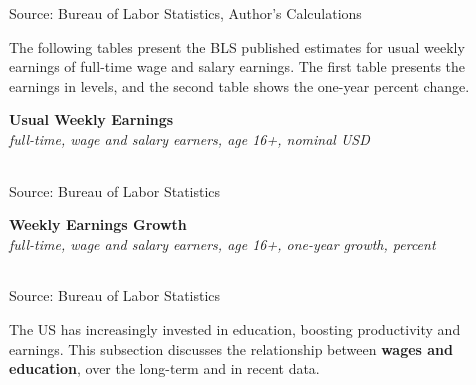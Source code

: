 \documentclass{report}
\newcommand{\tbllink}[1]{\href{https://raw.githubusercontent.com/bdecon/US-chartbook/master/chartbook/data/#1}{\faTable}}
\begin{document}
{\begin{minipage}{0.76\textwidth}
\footnotesize{Source: Bureau of Labor Statistics, Author's Calculations} \hfill \tbllink{uwe_bls_gr.csv} \ \ \tbllink{uwe_cps.csv}
\vspace{2mm}

\small The following tables present the BLS published estimates for usual weekly earnings of full-time wage and salary earnings. The first table presents the earnings in levels, and the second table shows the one-year percent change.
\vspace{2mm}

\normalsize \textbf{Usual Weekly Earnings}\\
\footnotesize{\textit{full-time, wage and salary earners, age 16+, nominal USD}}\\
 \setlength{\tabcolsep}{3.1pt} \color{black!90}
		{\renewcommand{\arraystretch}{1.54}
		 \begin{tabular}{p{19mm} R{8.8mm} R{8.8mm} R{8.8mm} R{8.8mm} R{8.8mm} R{8.8mm} 
		   R{8.8mm} R{8.8mm} R{8.8mm} R{8.8mm}}
			  \hline
		\end{tabular}}
\vspace{-3mm}
		
\footnotesize{Source: Bureau of Labor Statistics}
\vspace{3mm}

\normalsize \textbf{Weekly Earnings Growth}\\
\footnotesize{\textit{full-time, wage and salary earners, age 16+, one-year growth, percent}}\\
 \setlength{\tabcolsep}{3.1pt} \color{black!90}
	{\renewcommand{\arraystretch}{1.54}
		\begin{tabular}{p{19mm} R{8.8mm} R{8.8mm} R{8.8mm} R{8.8mm} R{8.8mm} R{8.8mm} 
		   R{8.8mm} R{8.8mm} R{8.8mm} R{8.8mm}}
			  \hline
		\end{tabular}}\vspace{-2mm}
				
\footnotesize{Source: Bureau of Labor Statistics}
\end{minipage}
\newpage
\begin{minipage}{0.76\textwidth}
\small The US has increasingly invested in education, boosting productivity and earnings. This subsection discusses the relationship between \textbf{wages and education}, over the long-term and in recent data. 




\end{minipage}}
\end{document}
